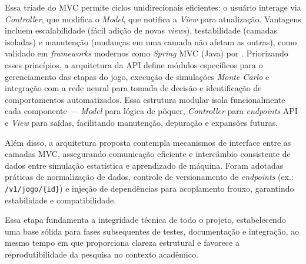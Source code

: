 Essa tríade do \gls{MVC} permite ciclos unidirecionais eficientes: o usuário interage via \textit{Controller}, que modifica o \textit{Model}, que notifica a \textit{View} para atualização. Vantagens incluem escalabilidade (fácil adição de novas \textit{views}), testabilidade (camadas isoladas) e manutenção (mudanças em uma camada não afetam as outras), como validado em \textit{frameworks} modernos como \textit{Spring} \gls{MVC} (Java) por . Priorizando esses princípios, a arquitetura da \gls{API} define módulos específicos para o gerenciamento das etapas do jogo, execução de simulações \textit{Monte Carlo} e integração com a rede neural para tomada de decisão e identificação de comportamentos automatizados. Essa estrutura modular isola funcionalmente cada componente --- \textit{Model} para lógica de pôquer, \textit{Controller} para \textit{endpoints} \gls{API} e \textit{View} para saídas, facilitando manutenção, depuração e expansões futuras.

Além disso, a arquitetura proposta contempla mecanismos de interface entre as camadas \gls{MVC}, assegurando comunicação eficiente e intercâmbio consistente de dados entre simulação estatística e aprendizado de máquina. Foram adotadas práticas de normalização de dados, controle de versionamento de \textit{endpoints} (ex.: \texttt{/v1/jogo/\{id\}}) e injeção de dependências para acoplamento frouxo, garantindo estabilidade e compatibilidade.

Essa etapa fundamenta a integridade técnica de todo o projeto, estabelecendo uma base sólida para fases subsequentes de testes, documentação e integração, ao mesmo tempo em que proporciona clareza estrutural e favorece a reprodutibilidade da pesquisa no contexto acadêmico.

